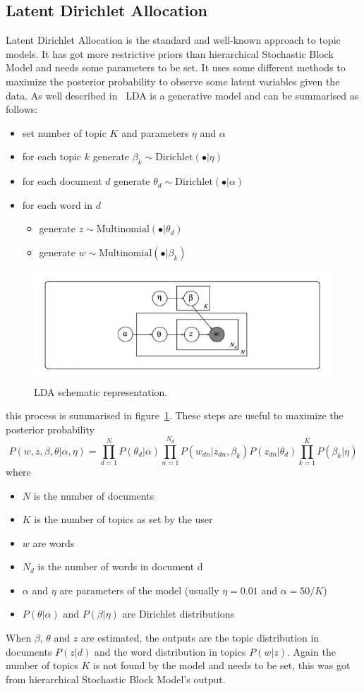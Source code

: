 \subsection{Latent Dirichlet Allocation}\label{sec:lda}
Latent Dirichlet Allocation is the standard and well-known approach to topic models. It has got more restrictive priors than hierarchical Stochastic Block Model and needs some parameters to be set. It uses some different methods to maximize the posterior probability to observe some latent variables given the data.
As well described in~\cite{Zhou2016} LDA is a generative model and can be summarised as follows:
\begin{itemize}
	\item set number of topic $K$ and parameters $\eta$ and $\alpha$
	\item for each topic $k$ generate $\beta_k\sim \text{Dirichlet}(\bullet |\eta)$
	\item for each document $d$ generate $\theta_d\sim \text{Dirichlet}(\bullet|\alpha)$
	\item for each word in $d$ 
	\begin{itemize}
		\item generate $z\sim \text{Multinomial}(\bullet|\theta_d)$
		\item generate $w\sim \text{Multinomial}(\bullet|\beta_k)$
	\end{itemize}
\end{itemize}
\begin{figure}[htb!]
	\centering
	\includegraphics[width=0.65\linewidth]{pictures/topic/LDA.jpeg}
	\caption{LDA schematic representation.}
	\label{fig:LDA}
\end{figure}
this process is summarised in figure~\ref{fig:LDA}. These steps are useful to maximize the posterior probability
\begin{equation}\label{eq:lda}
P(w, z,\beta, \theta| \alpha, \eta)=\prod_{d=1}^N P(\theta_d | \alpha)\prod_{n=1}^{N_d} P(w_{dn}|z_{dn},\beta_k)P(z_{dn}|\theta_d)\prod_{k=1}^KP(\beta_k|\eta)
\end{equation}
where
\begin{itemize}
	\item $N$ is the number of documents
	\item $K$ is the number of topics as set by the user
	\item $w$ are words
	\item $N_d$ is the number of words in document d
	\item $\alpha$ and $\eta$ are parameters of the model (usually $\eta=0.01$ and $\alpha=50/K$)
	\item $P(\theta | \alpha)$ and $P(\beta|\eta)$ are Dirichlet distributions
\end{itemize}
When $\beta$, $\theta$ and $z$ are estimated, the outputs are the topic distribution in documents $P(z|d)$ and the word distribution in topics $P(w|z)$.
Again the number of topics $K$ is not found by the model and needs to be set, this was got from hierarchical Stochastic Block Model's output.